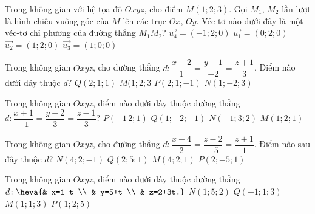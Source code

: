 \begin{ex}%
	Trong không gian với hệ tọa độ $Oxyz$, cho điểm $M( 1;2;3 )$. Gọi ${M}_{1}$, ${M}_{2}$ lần lượt là hình chiếu vuông góc của $M$ lên các trục $Ox$, $Oy$. Véc-tơ nào dưới đây là một véc-tơ chỉ phương của đường thẳng $M_1M_2$?
	\choice
	{ \True $\overrightarrow{{{u}_{4}}}=( -1;2;0 )$}
	{ $\overrightarrow{{u}_{1}}=( 0;2;0)$}
	{  $\overrightarrow {u_2}=( 1;2;0 )$}
	{ $\overrightarrow{{{u}_{3}}}=( 1;0;0 )$}
\end{ex}
\begin{ex}%
	Trong không gian $Oxyz$, cho đường thẳng $d \colon\dfrac{x-2}{1}=\dfrac{y-1}{-2}=\dfrac{z+1}{3}$. Điểm nào dưới đây thuộc $d$?
	\choice
	{ $Q( 2;1;1 )$}
	{ $M( 1;2;3 $}
	{ \True $P( 2;1;-1)$}
	{ $N( 1;-2;3) $}
\end{ex}
\begin{ex}%
	Trong không gian $Oxyz$, điểm nào dưới đây thuộc đường thẳng $d \colon \dfrac{x+1}{-1}=\dfrac{y-2}{3}=\dfrac{z-1}{3}$?
	\choice
	{\True $P(-1\,2;1)$}
	{ $Q(1;-2;-1)$}
	{ $N(-1;3;2)$}
	{ $M( 1;2;1)$}
\end{ex}
\begin{ex}%
	Trong không gian $Oxyz$, cho đường thẳng $d \colon \dfrac{x-4}{2}=\dfrac{z-2}{-5}=\dfrac{z+1}{1}$. Điểm nào sau đây thuộc $d$?
	\choice
	{ \True $N(4;2;-1)$}
	{ $Q(2;5;1)$}
	{ $M(4;2;1)$}
	{ $P(2;-5;1)$}
\end{ex}
\begin{ex}%
	Trong không gian $Oxyz$, điểm nào dưới đây thuộc đường thẳng $d \colon 
	\heva{& x=1-t \\ 
		& y=5+t \\ 
		& z=2+3t.}$
	\choice
	{ \True $N(1;5;2)$}
	{ $Q(-1;1;3)$}
	{ $M(1;1;3)$}
	{ $P(1;2;5)$}
\end{ex}
